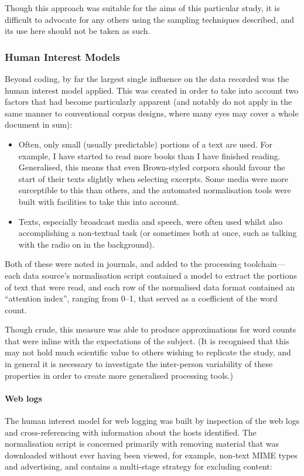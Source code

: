 Though this approach was suitable for the aims of this particular study, it is difficult to advocate for any others using the sampling techniques described, and its use here should not be taken as such.

\subsubsection{Human Interest Models}
Beyond coding, by far the largest single influence on the data recorded was the human interest model applied.  This was created in order to take into account two factors that had become particularly apparent (and notably do not apply in the same manner to conventional corpus designs, where many eyes may cover a whole document in sum):

\begin{itemize}
    \item Often, only small (usually predictable) portions of a text are used.  For example, I have started to read more books than I have finished reading.  Generalised, this means that even Brown-styled corpora should favour the start of their texts slightly when selecting excerpts.  Some media were more surceptible to this than others, and the automated normalisation tools were built with facilities to take this into account.
    \item Texts, especially broadcast media and speech, were often used whilst also accomplishing a non-textual task (or sometimes both at once, such as talking with the radio on in the background).
\end{itemize}

Both of these were noted in journals, and added to the processing toolchain---each data source's normalisation script contained a model to extract the portions of text that were read, and each row of the normalised data format contained an ``attention index'', ranging from 0--1, that served as a coefficient of the word count.

Though crude, this measure was able to produce approximations for word counts that were inline with the expectations of the subject.  (It is recognised that this may not hold much scientific value to others wishing to replicate the study, and in general it is necessary to investigate the inter-person variability of these properties in order to create more generalised processing tools.)


\paragraph{Web logs}
The human interest model for web logging was built by inspection of the web logs and cross-referencing with information about the hosts identified.  The normalisation script is concerned primarily with removing material that was downloaded without ever having been viewed, for example, non-text MIME types and advertising, and contains a multi-stage strategy for excluding content:


